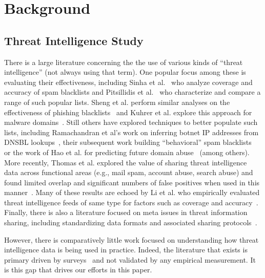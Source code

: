 \section{Background}

\subsection{Threat Intelligence Study}

There is a large literature concerning the the use of various kinds of
``threat intelligence'' (not always using that term). One popular focus among
these is evaluating their effectiveness, including Sinha et
al.~\cite{sinha2008shades} who analyze coverage and accuracy of spam
blacklists and Pitsillidis et al.~\cite{tasters:imc12} who characterize and
compare a range of such popular lists. Sheng et al. perform similar analyses
on the effectiveness of phishing blacklists~\cite{sheng2009empirical} and
Kuhrer et al. explore this approach for malware
domains~\cite{kuhrer2014paint}. Still others have explored techniques to
better populate such lists, including Ramachandran et al's work on inferring
botnet IP addresses from DNSBL lookups~\cite{ramachandran2006revealing},
their subsequent work building ``behavioral'' spam
blacklists~\cite{ramachandran2007filtering} or the work of Hao et al. for
predicting future domain abuse~\cite{hao2016predator,hao2013understanding}
(among others). More recently, Thomas et al. explored the value of sharing
threat intelligence data across functional areas (e.g., mail spam, account
abuse, search abuse) and found limited overlap and significant numbers of
false positives when used in this manner~\cite{thomas2016abuse}. Many of
these results are echoed by Li et al. who empirically evaluated threat
intelligence feeds of same type for factors such as coverage and
accuracy~\cite{li2019reading}. Finally, there is also a literature focused on
meta issues in threat information sharing, including standardizing data
formats and associated sharing protocols~\cite{barnum2012standardizing,
wagner2016misp, mavroeidis2017cyber, burger2014taxonomy}.

However, there is comparatively little work focused on understanding how
threat intelligence data is being used in practice. Indeed, the literature
that exists is primary driven by
surveys~\cite{ponemon2018cti,shackleford2017cyber} and not validated by any
empirical measurement. It is this gap that drives our efforts in this paper.

